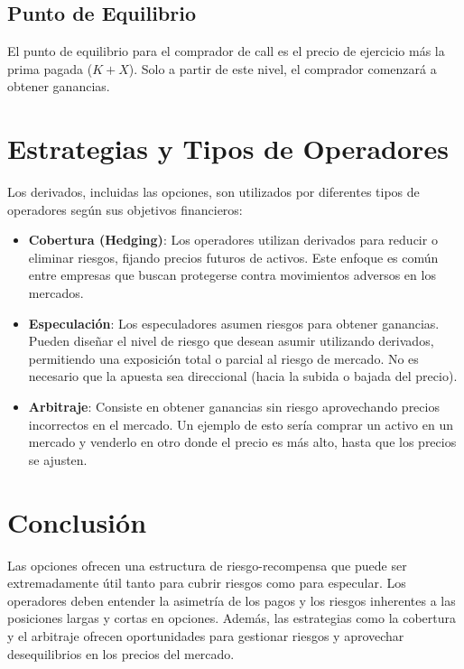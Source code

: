 \documentclass{article}
\begin{document}
\subsection*{Punto de Equilibrio}

El punto de equilibrio para el comprador de call es el precio de ejercicio más la prima pagada ($K + X$). Solo a partir de este nivel, el comprador comenzará a obtener ganancias.

\section*{Estrategias y Tipos de Operadores}

Los derivados, incluidas las opciones, son utilizados por diferentes tipos de operadores según sus objetivos financieros:

\begin{itemize}
    \item \textbf{Cobertura (Hedging)}: Los operadores utilizan derivados para reducir o eliminar riesgos, fijando precios futuros de activos. Este enfoque es común entre empresas que buscan protegerse contra movimientos adversos en los mercados.
    \item \textbf{Especulación}: Los especuladores asumen riesgos para obtener ganancias. Pueden diseñar el nivel de riesgo que desean asumir utilizando derivados, permitiendo una exposición total o parcial al riesgo de mercado. No es necesario que la apuesta sea direccional (hacia la subida o bajada del precio).
    \item \textbf{Arbitraje}: Consiste en obtener ganancias sin riesgo aprovechando precios incorrectos en el mercado. Un ejemplo de esto sería comprar un activo en un mercado y venderlo en otro donde el precio es más alto, hasta que los precios se ajusten.
\end{itemize}

\section*{Conclusión}

Las opciones ofrecen una estructura de riesgo-recompensa que puede ser extremadamente útil tanto para cubrir riesgos como para especular. Los operadores deben entender la asimetría de los pagos y los riesgos inherentes a las posiciones largas y cortas en opciones. Además, las estrategias como la cobertura y el arbitraje ofrecen oportunidades para gestionar riesgos y aprovechar desequilibrios en los precios del mercado.
\end{document}
